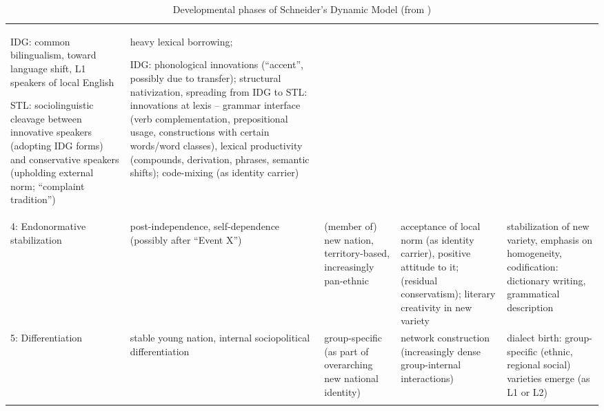 \begin{sidewaystable}
\begin{tabularx}{\textwidth}{L{2cm}L{3.5cm}L{3cm}L{4cm}L{4cm}}
IDG: common bilingualism, toward language shift, L1 speakers of local English

STL: sociolinguistic cleavage between innovative speakers (adopting IDG forms) and conservative speakers (upholding external norm; “complaint tradition”) & heavy lexical borrowing;

IDG: phonological innovations (“accent”, possibly due to transfer); structural nativization, spreading from IDG to STL: innovations at lexis – grammar interface (verb complementation, prepositional usage, constructions with certain words/word classes), lexical productivity (compounds, derivation, phrases, semantic shifts); code-mixing (as identity carrier)\\
4: Endonormative stabilization & post-independence, self-dependence (possibly after “Event X”) & (member of) new nation, territory-based, increasingly pan-ethnic & acceptance of local norm (as identity carrier), positive attitude to it; (residual conservatism); literary creativity in new variety & stabilization of new variety, emphasis on homogeneity, codification: dictionary writing, grammatical description\\
5: Differentiation & stable young nation, internal sociopolitical differentiation & group-specific (as part of overarching new national identity) & network construction (increasingly dense group-internal interactions) & dialect birth: group-specific (ethnic, regional social) varieties emerge (as L1 or L2)\\
\lspbottomrule
\end{tabularx}
\caption{
Developmental phases of Schneider’s Dynamic Model (from \citealt[56]{Schneider2007})
}
\label{tab:2:1}
\end{sidewaystable}

